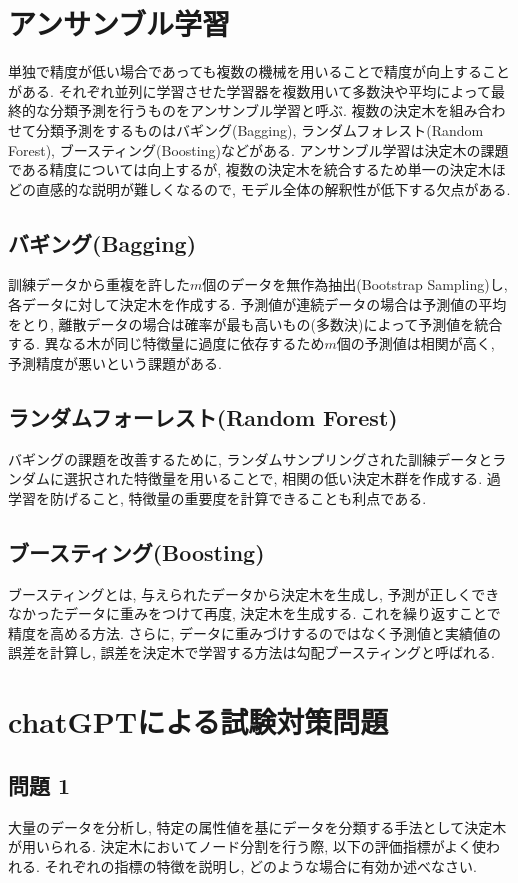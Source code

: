 \documentclass[dvipdfmx, 10pt]{jsarticle}
\begin{document}
\section*{アンサンブル学習}
単独で精度が低い場合であっても複数の機械を用いることで精度が向上することがある. 
それぞれ並列に学習させた学習器を複数用いて多数決や平均によって最終的な分類予測を行うものをアンサンブル学習と呼ぶ. 
複数の決定木を組み合わせて分類予測をするものはバギング(Bagging), ランダムフォレスト(Random Forest), ブースティング(Boosting)などがある. 
アンサンブル学習は決定木の課題である精度については向上するが, 
複数の決定木を統合するため単一の決定木ほどの直感的な説明が難しくなるので, モデル全体の解釈性が低下する欠点がある. 

\subsection*{バギング(Bagging)}
訓練データから重複を許した\(m\)個のデータを無作為抽出(Bootstrap Sampling)し, 各データに対して決定木を作成する. 
予測値が連続データの場合は予測値の平均をとり, 離散データの場合は確率が最も高いもの(多数決)によって予測値を統合する. 
異なる木が同じ特徴量に過度に依存するため\(m\)個の予測値は相関が高く, 予測精度が悪いという課題がある. 

\subsection*{ランダムフォーレスト(Random Forest)}
バギングの課題を改善するために, ランダムサンプリングされた訓練データとランダムに選択された特徴量を用いることで, 相関の低い決定木群を作成する. 
過学習を防げること, 特徴量の重要度を計算できることも利点である. 

\subsection*{ブースティング(Boosting)}
ブースティングとは, 与えられたデータから決定木を生成し, 予測が正しくできなかったデータに重みをつけて再度, 決定木を生成する. 
これを繰り返すことで精度を高める方法. さらに, データに重みづけするのではなく予測値と実績値の誤差を計算し, 
誤差を決定木で学習する方法は勾配ブースティングと呼ばれる. 

\section*{chatGPTによる試験対策問題}

\subsection*{問題 1}
大量のデータを分析し, 特定の属性値を基にデータを分類する手法として決定木が用いられる. 
決定木においてノード分割を行う際, 以下の評価指標がよく使われる. それぞれの指標の特徴を説明し, どのような場合に有効か述べなさい. 
\end{document}
